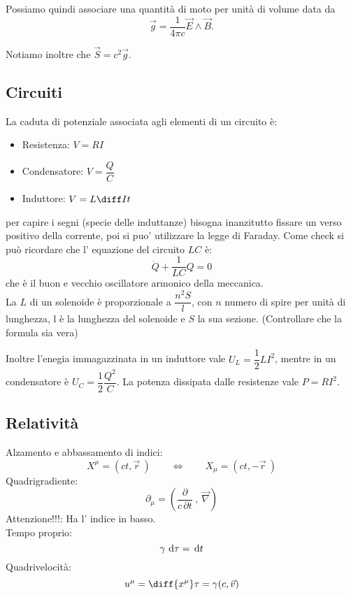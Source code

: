 \documentclass[a4paper,10pt,oneside]{math_article}
\newcommand{\grad}{\vec{\nabla}}
\begin{document}
			Possiamo quindi associare una quantità di moto per unità di volume data da 
			\begin{equation}
				\vec g = \frac1{4	\pi c} \vec E \wedge \vec B.
			\end{equation}
			
			Notiamo inoltre che $\vec S = c^2 \vec g$.			

		\subsection{Circuiti}
			La caduta di potenziale associata agli elementi di un circuito è:
			\begin{itemize}
			 \item Resistenza: $V=RI$
			 \item Condensatore: $V=\dfrac QC$
			 \item Induttore: $V=L\diff It$
			\end{itemize}
			per capire i segni (specie delle induttanze) bisogna inanzitutto fissare un verso positivo della corrente, poi si puo' utilizzare la legge di Faraday. Come check si può ricordare che l' equazione del circuito $LC$ è:
\begin{equation}
\ddot{Q}+\frac{1}{LC}Q=0
\end{equation}
che è il buon e vecchio oscillatore armonico della meccanica.\\			
			La $L$ di un solenoide è proporzionale a $\dfrac{n^2S}{l}$, con $n$ numero di spire per unità di lunghezza, l è la lunghezza del solenoide e $S$ la sua sezione. (Controllare che la formula sia vera)
			
			Inoltre l'enegia immagazzinata in un induttore vale $U_L=\dfrac12 LI^2$, mentre in un condensatore è $U_C=\dfrac12 \dfrac{Q^2}C$. La potenza dissipata dalle resistenze vale $P=RI^2$. 

		\subsection{Relatività}
			Alzamento e abbassamento di indici:
			\[
			X^\mu=\left(ct,\vec r\ \right)\qquad \Longleftrightarrow\qquad X_\mu=\left(ct,-\vec r\ \right)
			\]
			Quadrigradiente:
			\[
			\partial_\mu =\left(\frac{\partial}{c\, \partial t}\ ,\ \grad\right)
			\]
			Attenzione!!!: Ha l' indice in basso.\\			
			Tempo proprio:
			\begin{equation}
			\gamma\, \, \textrm{d} \tau=\, \textrm{d} t
\end{equation}						
			Quadrivelocità:
			\begin{equation}
				u^\mu = \diff{x^\mu}\tau = \gamma(c, \vec v)
			\end{equation}
\end{document}

